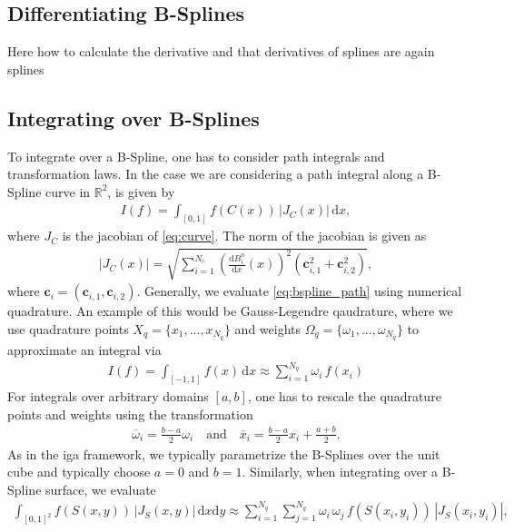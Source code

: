 \documentclass[12pt]{article}
\begin{document}
\subsection*{Differentiating B-Splines}
Here how to calculate the derivative and that derivatives of splines are again splines
\subsection*{Integrating over B-Splines}
To integrate over a B-Spline, one has to consider path integrals and transformation laws.
In the case we are considering a path integral along a B-Spline curve in $\mathbb{R}^2$, is given by
\begin{align}
\label{eq:bspline_path}
	I(f)=\int_{[0,1]} f\left( C(x)\right)\,\left|J_C\left(x\right)\right| \,\mathrm{d}x,
\end{align}
where $J_C$ is the jacobian of \eqref{eq:curve}.
The norm of the jacobian is given as 
\begin{align}
	\left|J_C(x) \right| = \sqrt{ \sum_{i=1}^{N_c} \left(\frac{\mathrm{d}B_i^n}{\mathrm{d}x}\left( x\right)\right)^2 \left(\mathbf{c}^2_{i,1} + \mathbf{c}^2_{i,2}\right)},
\end{align}
where $\mathbf{c}_{i} = (\mathbf{c}_{i,1}, \mathbf{c}_{i,2})$.
Generally, we evaluate \eqref{eq:bspline_path} using numerical quadrature.
An example of this would be Gauss-Legendre qaudrature, where we use quadrature points $X_q=\{x_1,...,x_{N_q}\}$ and weights $\Omega_q = \{\omega_1,...,\omega_{N_q}\}$ to approximate an integral via
\begin{align}
	I(f) = \int_{[-1,1]} f(x) \, \mathrm{d}x \approx \sum_{i=1}^{N_q} \omega_i \, f(x_i)
\end{align}
 For integrals over arbitrary domains $[a,b]$, one has to rescale the quadrature points and weights using the transformation
 \begin{align}
 	\overline{\omega}_i = \frac{b-a}{2} \omega_i\quad \text{and}\quad \overline{x}_i = \frac{b-a}{2}x_i + \frac{a+b}{2}.
 \end{align}
 As in the \gls{iga} framework, we typically parametrize the B-Splines over the unit cube and typically choose $a=0$ and $b=1$.
 Similarly, when integrating over a B-Spline surface, we evaluate
  \begin{align}
 	\int_{[0,1]^2} f\left(S(x,y)\right) \, \left|J_S(x,y) \right| \,\mathrm{d}x\mathrm{d}y \approx  \sum_{i=1}^{N_q} \sum_{j=1}^{N_q}  \omega_i \,\omega_j \, f\left(S(x_i,y_i) \right) \, \left|J_S(x_i,y_i) \right|,
 \end{align}
\end{document}
